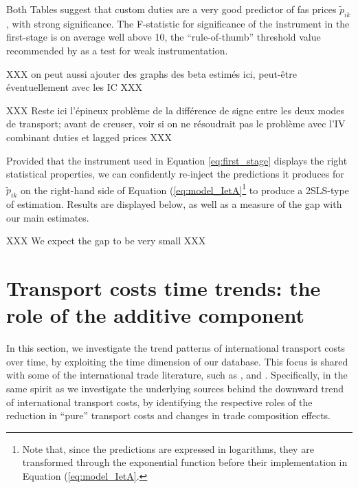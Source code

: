\documentclass[a4paper,11pt]{article}
\begin{document}
Both Tables suggest that custom duties are a very good predictor of fas prices $\widetilde{p}_{ik}$, with strong significance. The F-statistic for significance of the instrument in the first-stage is on average well above 10, the ``rule-of-thumb'' threshold value recommended by \cite{staiger_stock} as a test for weak instrumentation.

XXX on peut aussi ajouter des graphs des beta estimés ici, peut-être éventuellement avec les IC XXX

XXX Reste ici l'épineux problème de la différence de signe entre les deux modes de transport; avant de creuser, voir si on ne résoudrait pas le problème avec l'IV combinant duties et lagged prices XXX

Provided that the instrument used in Equation \ref{eq:first_stage} displays the right statistical properties, we can confidently re-inject the predictions it produces for $\widetilde{p}_{ik}$ on the right-hand side of Equation (\ref{eq:model_IetA}\footnote{Note that, since the predictions are expressed in logarithms, they are transformed through the exponential function before their implementation in Equation (\ref{eq:model_IetA}.} to produce a 2SLS-type of estimation. Results are displayed below, as well as a measure of the gap with our main estimates.

XXX We expect the gap to be very small XXX






\section{Transport costs time trends: the role of the additive component}\label{sec:results_trends}

In this section, we investigate the trend patterns of international transport costs over time, by exploiting the time dimension of our database.
This focus is shared with some of the international trade literature, such as \cite{Lafourcade_Thisse}, \cite{hummels2007} and \cite{Behar_Venables}.
Specifically, in the same spirit as \cite{hummels2007} we investigate the underlying sources behind the downward trend of international transport costs, by identifying the respective roles of the reduction in ``pure'' transport costs and changes in trade composition effects.
\end{document}

